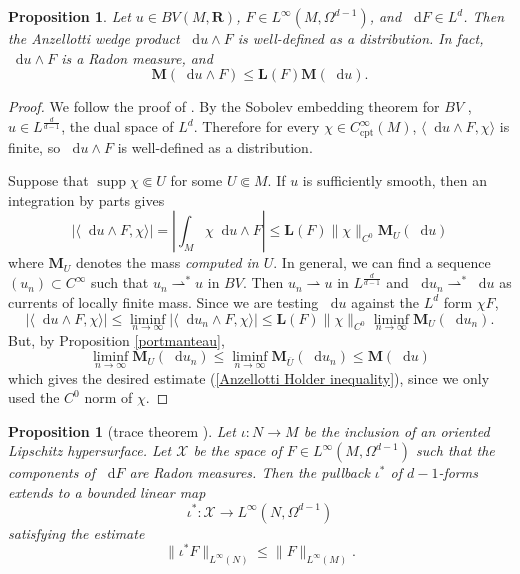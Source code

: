 \documentclass[reqno,11pt]{amsart}
\newcommand{\RR}{\mathbf{R}}
\newcommand*\dif{\mathop{}\!\mathrm{d}}
\DeclareMathOperator{\supp}{supp}
\newcommand{\weakto}{\rightharpoonup}
\newcommand{\Mass}{\mathbf M}
\newcommand{\Comass}{\mathbf L}
\newcommand{\cpt}{\mathrm{cpt}}
\newtheorem{proposition}[theorem]{Proposition}
\theoremstyle{definition}
\numberwithin{equation}{section}
\begin{document}
\begin{proposition}\label{Anzellotti wedge product exists}
Let $u \in BV(M, \RR)$, $F \in L^\infty(M, \Omega^{d - 1})$, and $\dif F \in L^d$.
Then the Anzellotti wedge product $\dif u \wedge F$ is well-defined as a distribution.
In fact, $\dif u \wedge F$ is a Radon measure, and 
\begin{equation}\label{Anzellotti Holder inequality}
\Mass(\dif u \wedge F) \leq \Comass(F) \Mass(\dif u).
\end{equation}
\end{proposition}
\begin{proof}
We follow the proof of \cite[Theorem 1.5]{Anzellotti1983}.
By the Sobolev embedding theorem for $BV$ \cite[\S5.6]{evans2015measure}, $u \in L^{\frac{d}{d - 1}}$, the dual space of $L^d$.
Therefore for every $\chi \in C^\infty_\cpt(M)$, $\langle \dif u \wedge F, \chi\rangle$ is finite, so $\dif u \wedge F$ is well-defined as a distribution.

Suppose that $\supp \chi \Subset U$ for some $U \Subset M$.
If $u$ is sufficiently smooth, then an integration by parts gives 
$$|\langle \dif u \wedge F, \chi\rangle| = \left|\int_M \chi \dif u \wedge F\right| \leq \Comass(F) \|\chi\|_{C^0} \Mass_U(\dif u)$$
where $\Mass_U$ denotes the mass \emph{computed in $U$}.
In general, we can find a sequence $(u_n) \subset C^\infty$ such that $u_n \weakto^* u$ in $BV$.
Then $u_n \weakto u$ in $L^{\frac{d}{d - 1}}$ and $\dif u_n \weakto^* \dif u$ as currents of locally finite mass.
Since we are testing $\dif u$ against the $L^d$ form $\chi F$,
$$|\langle \dif u \wedge F, \chi\rangle| \leq \liminf_{n \to \infty} |\langle \dif u_n \wedge F, \chi\rangle| \leq \Comass(F) \|\chi\|_{C^0} \liminf_{n \to \infty} \Mass_U(\dif u_n).$$
But, by Proposition \ref{portmanteau},
$$\liminf_{n \to \infty} \Mass_U(\dif u_n) \leq \liminf_{n \to \infty} \Mass_{\overline U}(\dif u_n) \leq \Mass(\dif u)$$
which gives the desired estimate (\ref{Anzellotti Holder inequality}), since we only used the $C^0$ norm of $\chi$.
\end{proof}

\begin{proposition}[trace theorem {\cite[Theorem 1.2]{Anzellotti1983}}]\label{integration is welldefined}
Let $\iota: N \to M$ be the inclusion of an oriented Lipschitz hypersurface.
Let $\mathcal X$ be the space of $F \in L^\infty(M, \Omega^{d - 1})$ such that the components of $\dif F$ are Radon measures.
Then the pullback $\iota^*$ of $d - 1$-forms extends to a bounded linear map
$$\iota^*: \mathcal X \to L^\infty(N, \Omega^{d - 1})$$
satisfying the estimate
\begin{equation}\label{integral over chain is linfinity}
	\|\iota^* F\|_{L^\infty(N)} \leq \|F\|_{L^\infty(M)}.
\end{equation}
\end{proposition}
\end{document}
